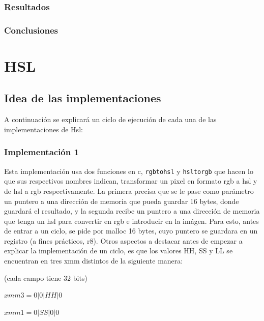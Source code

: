 \documentclass[a4paper]{article}
\begin{document}
\subsubsection{Resultados}

\subsubsection{Conclusiones}


\newpage

\section{HSL}

\subsection{Idea de las implementaciones}
A continuación se explicará un ciclo de ejecución de cada una de las implementaciones de Hsl:

\subsubsection{Implementación 1}

Esta implementación usa dos funciones en c, {\tt rgbtohsl} y {\tt hsltorgb} que hacen lo que sus respectivos nombres indican, transformar un pixel en formato rgb a hsl y de hsl a rgb respectivamente. La primera precisa que se le pase como parámetro un puntero a una dirección de memoria que pueda guardar 16 bytes, donde guardará el resultado, y la segunda recibe un puntero a una dirección de memoria que tenga un hsl para convertir en rgb e introducir en la imágen. Para esto, antes de entrar a un ciclo, se pide por malloc 16 bytes, cuyo puntero se guardara en un registro (a fines prácticos, r8).
Otros aspectos a destacar antes de empezar a explicar la implementación de un ciclo, es que los valores HH, SS y LL se encuentran en tres xmm distintos de la siguiente manera:

\vspace*{0.3cm}

(cada campo tiene 32 bits)

\vspace*{0.3cm}

$xmm3=0|0|HH|0$

\vspace*{0.3cm} 

$xmm1=0|SS|0|0$

\vspace*{0.3cm}
\end{document}
